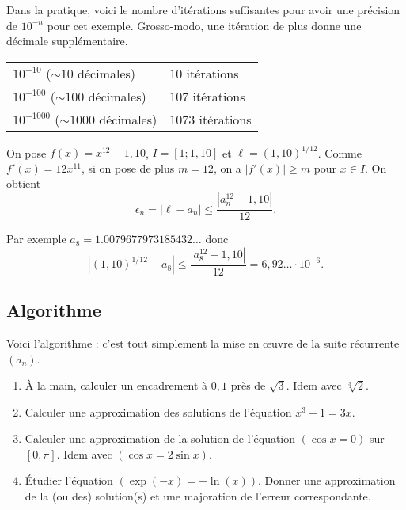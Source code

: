 \documentclass[class=report,crop=false]{standalone}
\begin{document}
Dans la pratique, voici le nombre d'itérations suffisantes pour avoir une
précision de $10^{-n}$ pour cet exemple. Grosso-modo, une itération
de plus donne une décimale supplémentaire.
\begin{center}
\begin{tabular}{ll}
  $10^{-10}$ ($\sim 10$ décimales) &  $10$ itérations \\
  $10^{-100}$ ($\sim 100$ décimales) &  $107$ itérations \\
  $10^{-1000}$ ($\sim 1000$ décimales) &  $1073$ itérations \\
\end{tabular}
\end{center}



\bigskip


\begin{exemple}
  On pose $f(x)=x^{12}-1,10$, $I=[1;1,10]$ et $\ell=(1,10)^{1/12}$.
  Comme $f'(x)=12x^{11}$, si on pose de plus $m=12$, on a $|f'(x)| \ge m$ pour $x\in I$.
  On obtient
  $$\epsilon_n =|\ell-a_n| \le \frac{|a_n^{12} - 1,10|}{12}.$$

  Par exemple $a_8 = 1.0079677973185432\ldots$ donc
  $$|(1,10)^{1/12}-a_8| \le \frac{|a_8^{12} - 1,10|}{12} = 6,92\ldots \cdot 10^{-6}.$$
\end{exemple}


\subsection{Algorithme}

Voici l'algorithme : c'est tout simplement
la mise en \oe uvre de la suite récurrente $(a_n)$.




\begin{miniexercices}
\begin{enumerate}
  \item \`A la main, calculer un encadrement à $0,1$ près de $\sqrt{3}$.
  Idem avec $\sqrt[3]{2}$.

  \item Calculer une approximation des solutions de l'équation $x^3+1=3x$.

  \item Calculer une approximation de la solution de l'équation $(\cos x = 0)$ sur $[0,\pi]$.
  Idem avec $(\cos x = 2\sin x)$.

  \item \'Etudier l'équation $(\exp(-x) = - \ln(x))$. Donner une approximation de la (ou des)
  solution(s) et une majoration de l'erreur correspondante.
\end{enumerate}
\end{miniexercices}
\end{document}
